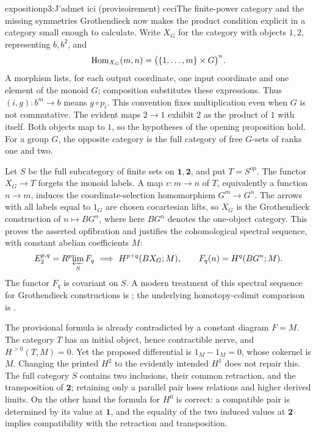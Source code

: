 \begin{dcomment}{exposition}{p3:J'admet ici (provisoirement) ceci}{The finite-power category and the missing symmetries}
Grothendieck now makes the product condition explicit in a category small enough to calculate. Write $X_G$ for the category with objects $1,2$, representing $b,b^2$, and
\[
 \mathrm{Hom}_{X_G}(m,n)=\bigl(\{1,\ldots,m\}\times G\bigr)^n.
\]
A morphism lists, for each output coordinate, one input coordinate and one element of the monoid $G$; composition substitutes these expressions. Thus $(i,g):b^m\to b$ means $g\circ p_i$. This convention fixes multiplication even when $G$ is not commutative. The evident maps $2\to1$ exhibit $2$ as the product of $1$ with itself. Both objects map to $1$, so the hypotheses of the opening proposition hold. For a group $G$, the opposite category is the full category of free $G$-sets of ranks one and two.

Let $S$ be the full subcategory of finite sets on $\mathbf1,\mathbf2$, and put $T=S^{\mathrm{op}}$. The functor $X_G\to T$ forgets the monoid labels. A map $v:m\to n$ of $T$, equivalently a function $n\to m$, induces the coordinate-selection homomorphism $G^m\to G^n$. The arrows with all labels equal to $1_G$ are chosen cocartesian lifts, so $X_G$ is the Grothendieck construction of $n\mapsto BG^n$, where here $BG^n$ denotes the one-object category. This proves the asserted opfibration and justifies the cohomological spectral sequence, with constant abelian coefficients $M$:
\[
 E_2^{p,q}=R^p\!\varprojlim_{S} F_q
 \ \Longrightarrow\ H^{p+q}(BX_G;M),
 \qquad F_q(n)=H^q(BG^n;M).
\]
The functor $F_q$ is covariant on $S$. A modern treatment of this spectral sequence for Grothendieck constructions is \citet[Corollaries 3--4]{Cegarra2020}; the underlying homotopy-colimit comparison is \citet[Theorem 1.2]{Thomason1979}.

The provisional formula is already contradicted by a constant diagram $F=M$. The category $T$ has an initial object, hence contractible nerve, and $H^{>0}(T,M)=0$. Yet the proposed differential is $1_M-1_M=0$, whose cokernel is $M$. Changing the printed $H^2$ to the evidently intended $H^1$ does not repair this. The full category $S$ contains two inclusions, their common retraction, and the transposition of $\mathbf2$; retaining only a parallel pair loses relations and higher derived limits. On the other hand the formula for $H^0$ is correct: a compatible pair is determined by its value at $\mathbf1$, and the equality of the two induced values at $\mathbf2$ implies compatibility with the retraction and transposition.
\end{dcomment}


